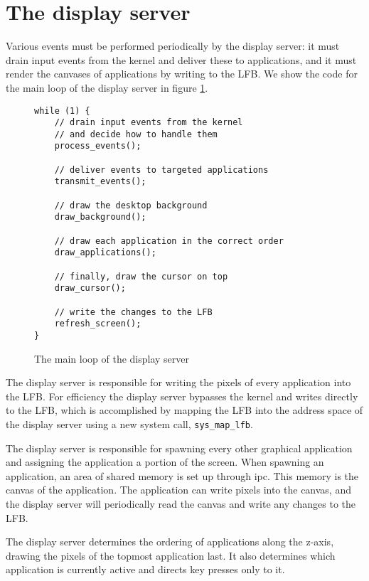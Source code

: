 \documentclass{report}
\begin{document}
\section{The display server}
Various events must be performed periodically by the display server: it must
drain input events from the kernel and deliver these to applications, and it
must render the canvases of applications by writing to the LFB. We show the
code for the main loop of the display server in figure \ref{displayserver}.
\begin{figure}[h]
\begin{framed}
\begin{Verbatim}[fontsize=\small]
while (1) {
	// drain input events from the kernel 
	// and decide how to handle them
	process_events();

	// deliver events to targeted applications
	transmit_events();

	// draw the desktop background
	draw_background();

	// draw each application in the correct order
	draw_applications();

	// finally, draw the cursor on top
	draw_cursor();
	
	// write the changes to the LFB
	refresh_screen();
}
\end{Verbatim}
\end{framed}
\caption{The main loop of the display server}
\label{displayserver}
\end{figure}

The display server is responsible for writing the pixels of every application
into the LFB. For efficiency the display server bypasses the kernel and writes
directly to the LFB, which is accomplished by mapping the LFB into the address
space of the display server using a new system call, \texttt{sys\_map\_lfb}.

The display server is responsible for spawning every other graphical
application and assigning the application a portion of the screen. When
spawning an application, an area of shared memory is set up through \gls{ipc}.
This memory is the canvas of the application. The application can write pixels
into the canvas, and the display server will periodically read the canvas and
write any changes to the LFB. 

The display server determines the ordering of applications along the z-axis,
drawing the pixels of the topmost application last. It also determines which
application is currently active and directs key presses only to it.
\end{document}
